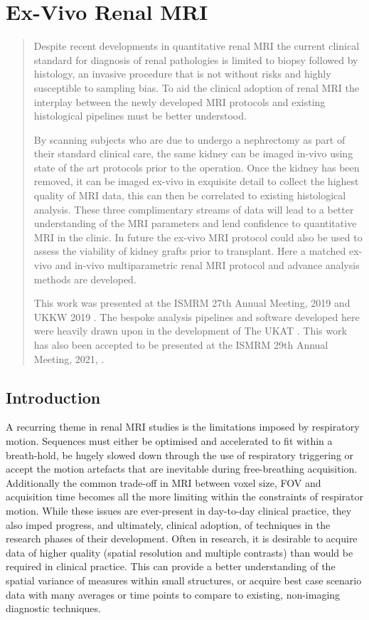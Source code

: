 \chapter{Ex-Vivo Renal MRI}
\label{chap:ex}
\newpage
\begin{abstract}
	Despite recent developments in quantitative renal \ac{MRI} the current clinical standard for diagnosis of renal pathologies is limited to biopsy followed by histology, an invasive procedure that is not without risks and highly susceptible to sampling bias. To aid the clinical adoption of renal \ac{MRI} the interplay between the newly developed \ac{MRI} protocols and existing histological pipelines must be better understood.	
	
	By scanning subjects who are due to undergo a nephrectomy as part of their standard clinical care, the same kidney can be imaged in-vivo using state of the art protocols prior to the operation. Once the kidney has been removed, it can be imaged ex-vivo in exquisite detail to collect the highest quality of \ac{MRI} data, this can then be correlated to existing histological analysis. These three complimentary streams of data will lead to a better understanding of the \ac{MRI} parameters and lend confidence to quantitative \ac{MRI} in the clinic. In future the ex-vivo \ac{MRI} protocol could also be used to assess the viability of kidney grafts prior to transplant. Here a matched ex-vivo and in-vivo multiparametric renal \ac{MRI} protocol and advance analysis methods are developed.
	
	This work was presented at the \ac{ISMRM} 27th Annual Meeting, 2019 \cite{daniel_effects_2019} and \ac{UKKW} 2019 \cite{kazmi_determining_2019-1}. The bespoke analysis pipelines and software developed here were heavily drawn upon in the development of The \ac{UKAT} \cite{nery_ukrin_2020}. This work has also been accepted to be presented at the \ac{ISMRM} 29th Annual Meeting, 2021, \cite{daniel_ukrin_2021}.
\end{abstract}
\acresetall
\newpage
\section{Introduction}

A recurring theme in renal \ac{MRI} studies is the limitations imposed by respiratory motion. Sequences must either be optimised and accelerated to fit within a breath-hold, be hugely slowed down through the use of respiratory triggering or accept the motion artefacts that are inevitable during free-breathing acquisition. Additionally the common trade-off in \ac{MRI} between voxel size, \ac{FOV} and acquisition time becomes all the more limiting within the constraints of respirator motion. While these issues are ever-present in day-to-day clinical practice, they also imped progress, and ultimately, clinical adoption, of techniques in the research phases of their development. Often in research, it is desirable to acquire data of higher quality (spatial resolution and multiple contrasts) than would be required in clinical practice. This can provide a better understanding of the spatial variance of measures within small structures, or acquire best case scenario data with many averages or time points to compare to existing, non-imaging diagnostic techniques.


